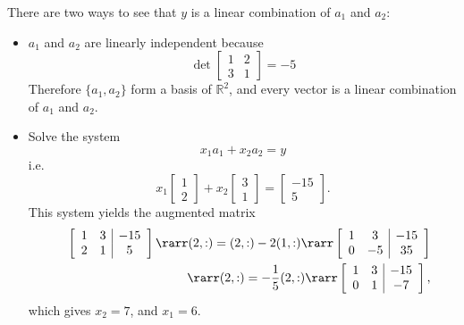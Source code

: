 There are two ways to see that $y$ is a linear combination of $a_1$ and $a_2$:
\begin{itemize}
  \item $a_1$ and $a_2$ are linearly independent because
	$$
	\det\left[\begin{array}{cc}
	            1&2 \\ 3&1
	          \end{array}\right] = -5
	$$
	Therefore $\{a_1,a_2\}$ form a basis of $\mathbb{R}^2$, and every vector is a linear combination of $a_1$ and $a_2$.
	\item Solve the system
	$$
	x_1a_1+x_2a_2 = y
	$$
	i.e.
	$$
x_1\left[\begin{array}{c}1\\2\end{array}\right] + x_2\left[\begin{array}{c}3\\1\end{array}\right] = \left[\begin{array}{c}-15\\5\end{array}\right].
	$$
	This system yields the augmented matrix
\begin{eqnarray*}
&&\left[\begin{array}{cc|c}1&3&-15\\2&1&5\end{array}\right]\rarr (2,:)=(2,:)-2(1,:)\rarr \left[\begin{array}{cc|c}1&3&-15\\0&-5&35\end{array}\right]\\
&&\rarr (2,:)=-\frac{1}{5}(2,:)\rarr \left[\begin{array}{cc|c}1&3&-15\\0&1&-7\end{array}\right],
\end{eqnarray*}
which gives $x_2=7$, and $x_1 = 6$.
	
\end{itemize}


